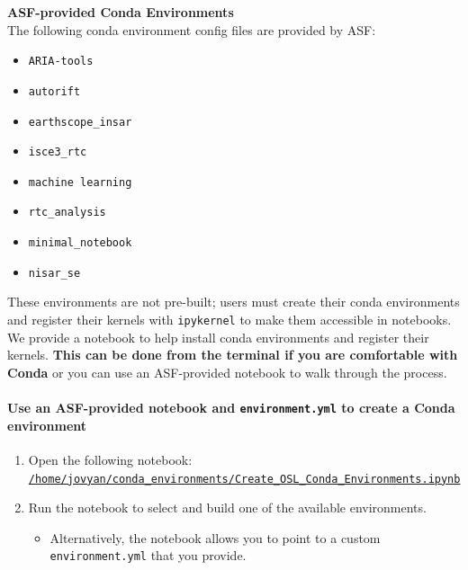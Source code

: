 \begin{framed}
\textbf{ASF-provided Conda Environments}\\
The following conda environment config files are provided by ASF:

\begin{itemize}
\item \texttt{ARIA-tools}
\item \texttt{autorift}
\item \texttt{earthscope\_insar}
\item \texttt{isce3\_rtc}
\item \texttt{machine learning}
\item \texttt{rtc\_analysis}
\item \texttt{minimal\_notebook}
\item \texttt{nisar\_se}
\end{itemize}

These environments are not pre-built; users must create their conda environments and register their kernels with \texttt{ipykernel} to make them accessible in notebooks. We provide a notebook to help install conda environments and register their kernels. \textbf{This can be done from the terminal if you are comfortable with Conda} or you can use an ASF-provided notebook to walk through the process.
\end{framed}

\paragraph{Use an ASF-provided notebook and \texttt{environment.yml} to create a Conda environment}\label{Use-an-ASF-provided-notebook-and-environment-yml-to-create-a-Conda-environment}

\begin{enumerate}
\item Open the following notebook: \href{https://opensciencelab.asf.alaska.edu/lab/smce-prod-opensarlab/hub/user-redirect/lab/tree/conda\_environments/Create\_OSL\_Conda\_Environments.ipynb}{\texttt{/home/jovyan/conda\_environments/Create\_OSL\_Conda\_Environments.ipynb}}
\item Run the notebook to select and build one of the available environments.\begin{itemize}
\item Alternatively, the notebook allows you to point to a custom \texttt{environment.yml} that you provide.
\end{itemize}
\end{enumerate}

